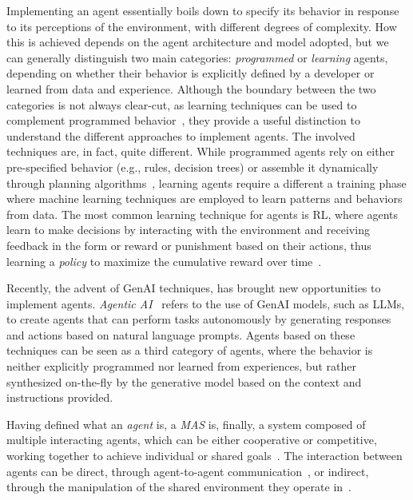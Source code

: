 Implementing an agent essentially boils down to specify its behavior in response to its perceptions of the environment, with different degrees of complexity. 
%
How this is achieved depends on the agent architecture and model adopted, but we can generally  distinguish two main categories: \emph{programmed} or \emph{learning} agents, depending on whether their behavior is explicitly defined by a developer or learned from data and experience. 
%
Although the boundary between the two categories is not always clear-cut, as learning techniques can be used to complement programmed behavior~\cite{Bordini_El_Fallah_Seghrouchni_Hindriks_Logan_Ricci_2020,Bosello_Ricci_2020}, they provide a useful distinction to understand the different approaches to implement agents.
%
The involved techniques are, in fact, quite different.
%
While programmed agents rely on either pre-specified behavior (e.g., rules, decision trees) or assemble it dynamically through planning algorithms~\cite{Ghallab_Nau_Traverso_2004},
learning agents require a different a training phase where machine learning techniques are employed to learn patterns and behaviors from data.
%
The most common learning technique for agents is \ac{RL}, where agents learn to make decisions by interacting with the environment and receiving feedback in the form or reward or punishment based on their actions, thus learning a \emph{policy} to maximize the cumulative reward over time~\cite{Sutton_Barto_1998}.

Recently, the advent of \ac{GenAI} techniques, has brought new opportunities to implement agents. \emph{Agentic \ac{AI}}~\cite{Acharya_Kuppan_Divya_2025} refers to the use of \ac{GenAI} models, such as \acp{LLM}, to create agents that can perform tasks autonomously by generating responses and actions based on natural language prompts.
%
Agents based on these techniques can be seen as a third category of agents, where the behavior is neither explicitly programmed nor learned from experiences, but rather synthesized on-the-fly by the generative model based on the context and instructions provided.

Having defined what an \emph{agent} is, a \emph{\acl{MAS}} is, finally, a system composed of multiple interacting agents, which can be either cooperative or competitive, working together to achieve individual or shared goals~\cite{2009wooldridge}.
%
The interaction between agents can be direct, through agent-to-agent communication~\cite{Kone_Shimazu_Nakajima_2000}, or indirect, through the manipulation of the shared environment they operate in~\cite{Weyns_Omicini_Odell_2007}.

